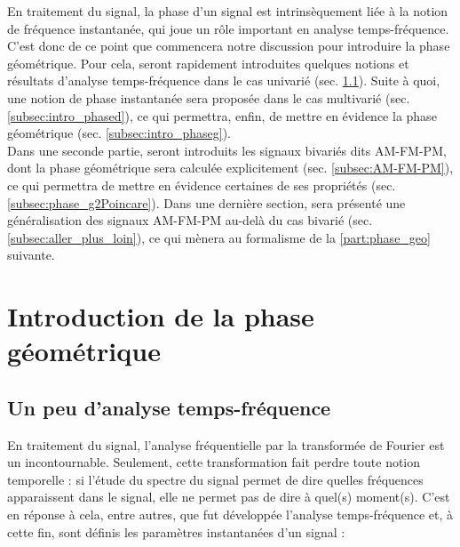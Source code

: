 
En traitement du signal, la phase d'un signal est intrinsèquement liée à la notion de fréquence instantanée, qui joue un rôle important en analyse temps-fréquence. 
C'est donc de ce point que commencera notre discussion pour introduire la phase géométrique.
Pour cela, seront rapidement introduites quelques notions et résultats d'analyse temps-fréquence dans le cas univarié (sec. \ref{subsec:ana_temp-freq}). Suite à quoi, une notion de phase instantanée sera proposée dans le cas multivarié (sec. \ref{subsec:intro_phased}), ce qui permettra, enfin, de mettre en évidence la phase géométrique (sec. \ref{subsec:intro_phaseg}).
\\

Dans une seconde partie, seront introduits les signaux bivariés dits AM-FM-PM, dont la phase géométrique sera calculée explicitement (sec. \ref{subsec:AM-FM-PM}), ce qui permettra de mettre en évidence certaines de ses propriétés (sec. \ref{subsec:phase_g2Poincare}). Dans une dernière section, sera présenté une généralisation des signaux AM-FM-PM au-delà du cas bivarié (sec. \ref{subsec:aller_plus_loin}), ce qui mènera au formalisme de la \cref{part:phase_geo} suivante.
\\




\section{Introduction de la phase géométrique} \label{sec:intro_phaseg}

\subsection{Un peu d'analyse temps-fréquence} \label{subsec:ana_temp-freq}

En traitement du signal, l'analyse fréquentielle par la transformée de Fourier est un incontournable. 
Seulement, cette transformation fait perdre toute notion temporelle : si l'étude du spectre du signal permet de dire quelles fréquences apparaissent dans le signal, elle ne permet pas de dire à quel(s) moment(s). 
C'est en réponse à cela, entre autres, que fut développée l'analyse temps-fréquence et, à cette fin, sont définis les paramètres instantanées d'un signal :\par

